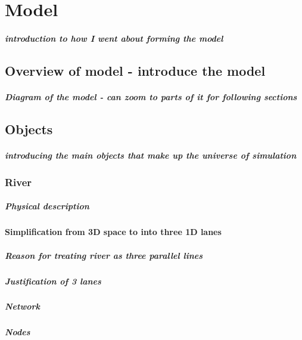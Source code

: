 \chapter{Model}
  \paragraph{introduction to how I went about forming the model}
  \section{Overview of model - introduce the model}
    \paragraph{Diagram of the model - can zoom to parts of it for following sections}
  \section{Objects}
    \paragraph{introducing the main objects that make up the universe of simulation}

    \subsection{River}
      \paragraph{Physical description}
      \subsubsection{Simplification from 3D space to into three 1D lanes}
        \paragraph{Reason for treating river as three parallel lines}
        \paragraph{Justification of 3 lanes}
        \paragraph{Network}
        \paragraph{Nodes}
